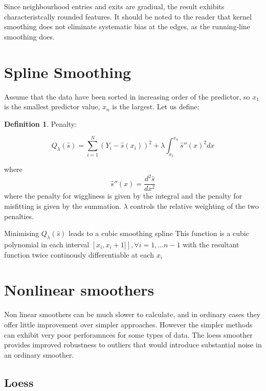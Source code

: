 \documentclass[twoside]{article}
\theoremstyle{definition}
\theoremstyle{definition}
\newtheorem*{proof1}{Definition}
\newenvironment{ddef}{\begin{dBox}\begin{proof1}}{\hfill{\scriptsize}\end{proof1}\end{dBox}}
\begin{document}
Since neighbourhood entries and exits are gradiual, the result exhibits characteristcally rounded features. It should be noted to the reader that kernel smoothing does not eliminate systematic bias at the edges, as the running-line smoothing does. 

\section{Spline Smoothing}

Assume that the data have been sorted in increasing order of the predictor, so $x_1$ is the smallest predictor value, $x_n$ is the largest. Let us define:

\begin{ddef}
	Penalty:

	\begin{equation}
		Q_\lambda (\hat{s}) = \sum^N_{i=1} \left( Y_i - \hat{s}(x_i) \right)^2 + \lambda \int_{x_1}^{x_n} \hat{s}''(x)^2dx
	\end{equation}

	where 
	\begin{equation}
		\hat{s}''(x) = \frac{d^2\hat{s}}{dx^2}
	\end{equation}
	where the penalty for wiggliness is given by the integral and the penalty for misfitting is given by the summation. $\lambda$ controls the relative weighting of the two penalties. 
\end{ddef}

Minimising $Q_\lambda(\hat{s})$ leads to a cubic smoothing spline This function is a cubic polynomial in each interval $\left[ x_i, x_i+1] \right], \forall i = 1, \dots n-1$ with the resultant function twice continously differentiable at each $x_i$


\section{Nonlinear smoothers}

Non linear smoothers can be much slower to calculate, and in ordinary cases they offer little improvement over simpler approaches. However the simpler methods can exhibit very poor perforamnces for some types of data. The loess smoother provides improved robustness to outliers that would introduce substantial noise in an ordinary smoother. 

\subsection{Loess}
\end{document}
